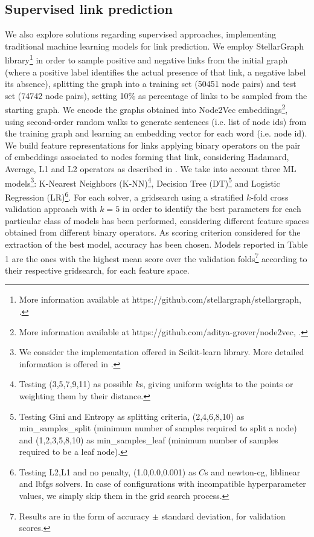 \documentclass[sigchi]{acmart}
\begin{document}
\subsection{Supervised link prediction}
We also explore solutions regarding supervised approaches, implementing traditional machine learning models for link prediction. We employ StellarGraph library\footnote{More information available at https://github.com/stellargraph/stellargraph, \cite{StellarGraph}.} in order to sample positive and negative links from the initial graph (where a positive label identifies the actual presence of that link, a negative label its absence), splitting the graph into a training set (50451 node pairs) and test set (74742 node pairs), setting 10\% as percentage of links to be sampled from the starting graph. We encode the graphs obtained into Node2Vec embeddings\footnote{More information available at https://github.com/aditya-grover/node2vec, \cite{node2vec-kdd2016}.}, using second-order random walks to generate sentences (i.e. list of node ids) from the training graph and learning an embedding vector for each word (i.e. node id). We build feature representations for links applying binary operators on the pair of embeddings associated to nodes forming that link, considering Hadamard, Average, L1 and L2 operators as described in \cite{jorgschl}. We take into account three ML models\footnote{We consider the implementation offered in Scikit-learn library. More detailed information is offered in \cite{Pped}.}: K-Nearest Neighbors (K-NN)\footnote{Testing (3,5,7,9,11) as possible $k$s, giving uniform weights to the points or weighting them by their distance.}, Decision Tree (DT)\footnote{Testing Gini and Entropy as splitting criteria, (2,4,6,8,10) as min\_samples\_split (minimum number of samples required to split a node) and (1,2,3,5,8,10) as min\_samples\_leaf (minimum number of samples required to be a leaf node).}  and Logistic Regression (LR)\footnote{Testing L2,L1 and no penalty, (1.0,0.0,0.001) as $C$s and newton-cg, liblinear and lbfgs solvers. In case of configurations with incompatible hyperparameter values, we simply skip them in the grid search process.}. For each solver, a gridsearch using a stratified $k$-fold cross validation approach with $k=5$ in order to identify the best parameters for each particular class of models has been performed, considering different feature spaces obtained from different binary operators. As scoring criterion considered for the extraction of the best model, accuracy has been chosen. Models reported in Table 1 are the ones with the highest mean score over the validation folds\footnote{Results are in the form of accuracy $\pm$ standard deviation, for validation scores.} according to their respective gridsearch, for each feature space.
\end{document}
